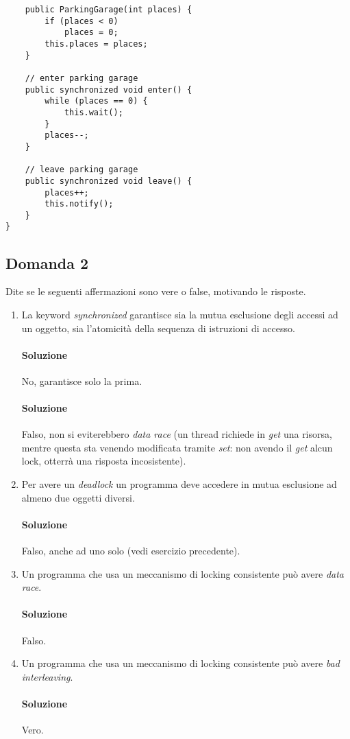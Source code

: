\begin{enumerate}
\begin{lstlisting}
	public ParkingGarage(int places) {
		if (places < 0)
			places = 0;
		this.places = places;
	}
	
	// enter parking garage
	public synchronized void enter() {
		while (places == 0) {
			this.wait();
		}
		places--;
	}
	
	// leave parking garage
	public synchronized void leave() {
		places++;
		this.notify();
	}
}
	\end{lstlisting}
\end{enumerate}

\newpage

\subsection{Domanda 2}
Dite se le seguenti affermazioni sono vere o false, motivando le risposte.
\begin{enumerate}
	\item La keyword \textit{synchronized} garantisce sia la mutua esclusione degli accessi ad un oggetto, sia l'atomicità della sequenza di istruzioni di accesso.
	\paragraph{Soluzione}
	No, garantisce solo la prima.
	\paragraph{Soluzione}
	Falso, non si eviterebbero \textit{data race} (un thread richiede in \textit{get} una risorsa, mentre questa sta venendo modificata tramite \textit{set}: non avendo il \textit{get} alcun lock, otterr\`a una risposta incosistente).
	\item Per avere un \textit{deadlock} un programma deve accedere in mutua esclusione ad almeno due oggetti diversi.
	\paragraph{Soluzione}
	Falso, anche ad uno solo (vedi esercizio precedente).
	\item Un programma che usa un meccanismo di locking consistente può avere \textit{data race}.
	\paragraph{Soluzione}
	Falso.
	\item Un programma che usa un meccanismo di locking consistente può avere \textit{bad interleaving}.
	\paragraph{Soluzione}
	Vero.
\end{enumerate}

